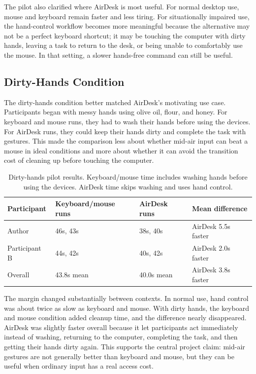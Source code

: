 \documentclass[manuscript]{acmart}
\begin{document}
The pilot also clarified where AirDesk is most useful. For normal desktop use, mouse and keyboard remain faster and less tiring. For situationally impaired use, the hand-control workflow becomes more meaningful because the alternative may not be a perfect keyboard shortcut; it may be touching the computer with dirty hands, leaving a task to return to the desk, or being unable to comfortably use the mouse. In that setting, a slower hands-free command can still be useful.

\subsection{Dirty-Hands Condition}

The dirty-hands condition better matched AirDesk's motivating use case. Participants began with messy hands using olive oil, flour, and honey. For keyboard and mouse runs, they had to wash their hands before using the devices. For AirDesk runs, they could keep their hands dirty and complete the task with gestures. This made the comparison less about whether mid-air input can beat a mouse in ideal conditions and more about whether it can avoid the transition cost of cleaning up before touching the computer.

\begin{table}[h]
  \caption{Dirty-hands pilot results. Keyboard/mouse time includes washing hands before using the devices. AirDesk time skips washing and uses hand control.}
  \label{tab:dirty-hands-results}
  \centering
  \begin{tabular}{llll}
    \hline
    Participant & Keyboard/mouse runs & AirDesk runs & Mean difference \\
    \hline
    Author & 46s, 43s & 38s, 40s & AirDesk 5.5s faster \\
    Participant B & 44s, 42s & 40s, 42s & AirDesk 2.0s faster \\
    Overall & 43.8s mean & 40.0s mean & AirDesk 3.8s faster \\
    \hline
  \end{tabular}
\end{table}

The margin changed substantially between contexts. In normal use, hand control was about twice as slow as keyboard and mouse. With dirty hands, the keyboard and mouse condition added cleanup time, and the difference nearly disappeared. AirDesk was slightly faster overall because it let participants act immediately instead of washing, returning to the computer, completing the task, and then getting their hands dirty again. This supports the central project claim: mid-air gestures are not generally better than keyboard and mouse, but they can be useful when ordinary input has a real access cost.
\end{document}
